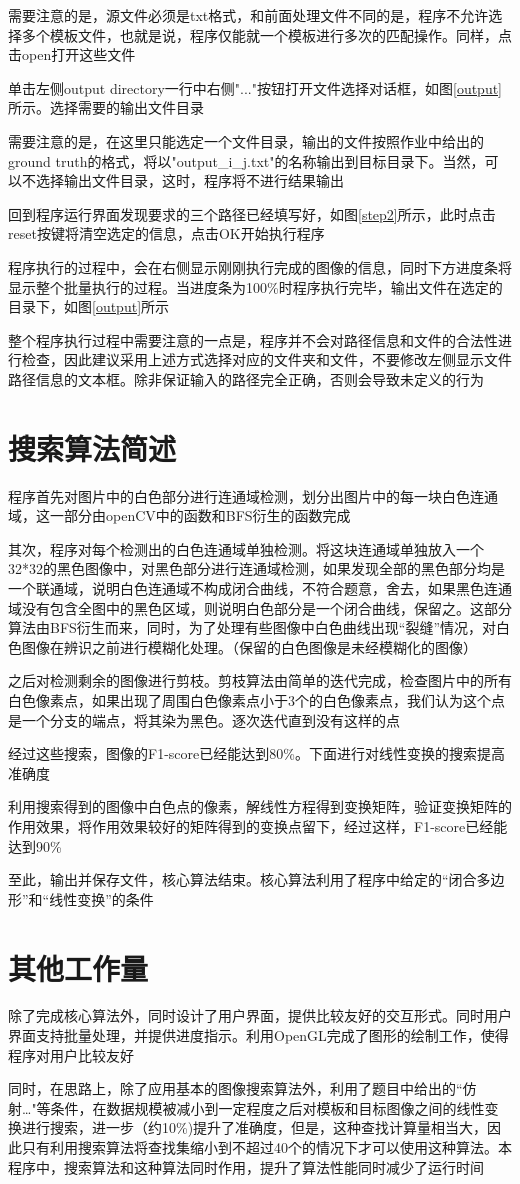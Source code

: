 \documentclass[UTF8,a4paper]{ctexart}
\begin{document}
需要注意的是，源文件必须是txt格式，和前面处理文件不同的是，程序不允许选择多个模板文件，也就是说，程序仅能就一个模板进行多次的匹配操作。同样，点击open打开这些文件

单击左侧output directory一行中右侧"..."按钮打开文件选择对话框，如图\ref{output}所示。选择需要的输出文件目录

需要注意的是，在这里只能选定一个文件目录，输出的文件按照作业中给出的ground truth的格式，将以"output\_i\_j.txt"的名称输出到目标目录下。当然，可以不选择输出文件目录，这时，程序将不进行结果输出

回到程序运行界面发现要求的三个路径已经填写好，如图\ref{step2}所示，此时点击reset按键将清空选定的信息，点击OK开始执行程序

程序执行的过程中，会在右侧显示刚刚执行完成的图像的信息，同时下方进度条将显示整个批量执行的过程。当进度条为100\%时程序执行完毕，输出文件在选定的目录下，如图\ref{output}所示

整个程序执行过程中需要注意的一点是，程序并不会对路径信息和文件的合法性进行检查，因此建议采用上述方式选择对应的文件夹和文件，不要修改左侧显示文件路径信息的文本框。除非保证输入的路径完全正确，否则会导致未定义的行为
\section{搜索算法简述}
程序首先对图片中的白色部分进行连通域检测，划分出图片中的每一块白色连通域，这一部分由openCV中的函数和BFS衍生的函数完成

其次，程序对每个检测出的白色连通域单独检测。将这块连通域单独放入一个32*32的黑色图像中，对黑色部分进行连通域检测，如果发现全部的黑色部分均是一个联通域，说明白色连通域不构成闭合曲线，不符合题意，舍去，如果黑色连通域没有包含全图中的黑色区域，则说明白色部分是一个闭合曲线，保留之。这部分算法由BFS衍生而来，同时，为了处理有些图像中白色曲线出现“裂缝”情况，对白色图像在辨识之前进行模糊化处理。（保留的白色图像是未经模糊化的图像）

之后对检测剩余的图像进行剪枝。剪枝算法由简单的迭代完成，检查图片中的所有白色像素点，如果出现了周围白色像素点小于3个的白色像素点，我们认为这个点是一个分支的端点，将其染为黑色。逐次迭代直到没有这样的点

经过这些搜索，图像的F1-score已经能达到80\%。下面进行对线性变换的搜索提高准确度

利用搜索得到的图像中白色点的像素，解线性方程得到变换矩阵，验证变换矩阵的作用效果，将作用效果较好的矩阵得到的变换点留下，经过这样，F1-score已经能达到90\%

至此，输出并保存文件，核心算法结束。核心算法利用了程序中给定的“闭合多边形”和“线性变换”的条件
\section{其他工作量}
除了完成核心算法外，同时设计了用户界面，提供比较友好的交互形式。同时用户界面支持批量处理，并提供进度指示。利用OpenGL完成了图形的绘制工作，使得程序对用户比较友好

同时，在思路上，除了应用基本的图像搜索算法外，利用了题目中给出的“仿射…"等条件，在数据规模被减小到一定程度之后对模板和目标图像之间的线性变换进行搜索，进一步（约10\%)提升了准确度，但是，这种查找计算量相当大，因此只有利用搜索算法将查找集缩小到不超过40个的情况下才可以使用这种算法。本程序中，搜索算法和这种算法同时作用，提升了算法性能同时减少了运行时间
\end{document}
